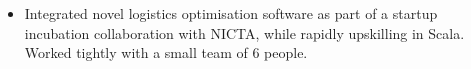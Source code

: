 \documentclass[10pt,a4paper,ragged2e]{altacv}
\begin{document}
\vspace{3mm}

\begin{itemize}
\item Integrated novel logistics optimisation software as part of a startup incubation collaboration with NICTA, while rapidly upskilling in Scala. Worked tightly with a small team of 6 people.

\end{itemize}

\clearpage
\end{document}
